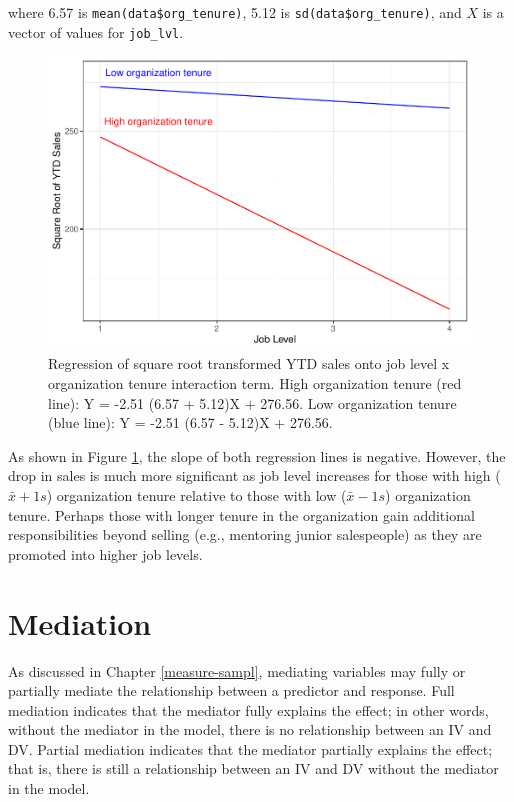 \documentclass[
]{book}
\begin{document}
where 6.57 is \texttt{mean(data\$org\_tenure)}, 5.12 is \texttt{sd(data\$org\_tenure)}, and \(X\) is a vector of values for \texttt{job\_lvl}.

\begin{figure}

{\centering \includegraphics[width=1\linewidth]{The_Fundamentals_of_People_Analytics_files/figure-latex/int-effects-1} 

}

\caption{Regression of square root transformed YTD sales onto job level x organization tenure interaction term. High organization tenure (red line): Y = -2.51 (6.57 + 5.12)X + 276.56. Low organization tenure (blue line): Y = -2.51 (6.57 - 5.12)X + 276.56.}\label{fig:int-effects}
\end{figure}

As shown in Figure \ref{fig:int-effects}, the slope of both regression lines is negative. However, the drop in sales is much more significant as job level increases for those with high (\(\bar{x} + 1s\)) organization tenure relative to those with low (\(\bar{x} - 1s\)) organization tenure. Perhaps those with longer tenure in the organization gain additional responsibilities beyond selling (e.g., mentoring junior salespeople) as they are promoted into higher job levels.

\hypertarget{mediation}{%
\section{Mediation}\label{mediation}}

As discussed in Chapter \ref{measure-sampl}, mediating variables may fully or partially mediate the relationship between a predictor and response. Full mediation indicates that the mediator fully explains the effect; in other words, without the mediator in the model, there is no relationship between an IV and DV. Partial mediation indicates that the mediator partially explains the effect; that is, there is still a relationship between an IV and DV without the mediator in the model.
\end{document}
